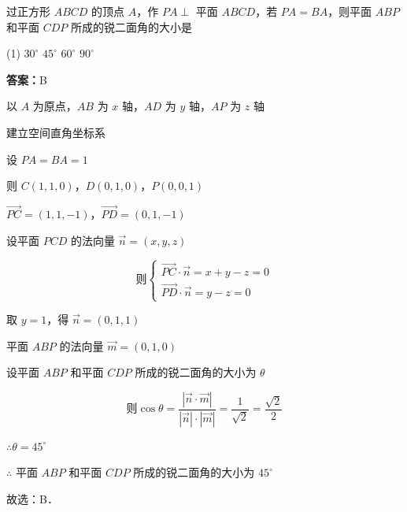 \begin{example}[\bkstar{3}{5}]
过正方形 $ABCD$ 的顶点 $A$，作 $PA\perp$ 平面 $ABCD$，若 $PA=BA$，则平面 $ABP$ 和平面 $CDP$ 所成的锐二面角的大小是
\begin{tasks}(1)
    \task $30^{\circ}$
    \task $45^{\circ}$
    \task $60^{\circ}$
    \task $90^{\circ}$
\end{tasks}
\end{example}
\begin{solution}
\textbf{答案：}B

以 $A$ 为原点，$AB$ 为 $x$ 轴，$AD$ 为 $y$ 轴，$AP$ 为 $z$ 轴

建立空间直角坐标系

设 $PA=BA=1$

则 $C(1,1,0)$，$D(0,1,0)$，$P(0,0,1)$

$\overrightarrow{PC}=(1,1,-1)$，$\overrightarrow{PD}=(0,1,-1)$

设平面 $PCD$ 的法向量 $\overrightarrow{n}=(x,y,z)$

$$
\text{则}\left\{\begin{array}{l}
\overrightarrow{PC}\cdot\overrightarrow{n}=x+y-z=0\\
\overrightarrow{PD}\cdot\overrightarrow{n}=y-z=0
\end{array}\right.
$$

取 $y=1$，得 $\overrightarrow{n}=(0,1,1)$

平面 $ABP$ 的法向量 $\overrightarrow{m}=(0,1,0)$

设平面 $ABP$ 和平面 $CDP$ 所成的锐二面角的大小为 $\theta$

$$
\text{则}\cos\theta=\dfrac{\left|\overrightarrow{n}\cdot\overrightarrow{m}\right|}{\left|\overrightarrow{n}\right|\cdot\left|\overrightarrow{m}\right|}=\dfrac{1}{\sqrt{2}}=\dfrac{\sqrt{2}}{2}
$$

$\therefore \theta=45^{\circ}$

$\therefore$ 平面 $ABP$ 和平面 $CDP$ 所成的锐二面角的大小为 $45^{\circ}$

故选：B．
\end{solution}

\vspace{2em}

